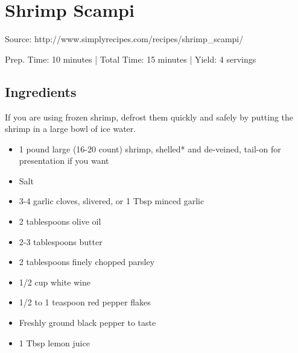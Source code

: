 \section{Shrimp Scampi}

Source: http://www.simplyrecipes.com/recipes/shrimp\_scampi/

\begin{center}
Prep. Time: 10 minutes |
Total Time: 15 minutes |
Yield: 4 servings
\end{center}

\subsection{Ingredients}
If you are using frozen shrimp, defrost them quickly and safely by putting the shrimp in a large bowl of ice water.
\begin{multicols}{2}
\begin{itemize}
    \item 1 pound large (16-20 count) shrimp, shelled* and de-veined, tail-on for presentation if you want
    \item Salt
    \item 3-4 garlic cloves, slivered, or 1 Tbsp minced garlic
    \item 2 tablespoons olive oil
    \item 2-3 tablespoons butter
    \item 2 tablespoons finely chopped parsley
    \item 1/2 cup white wine
    \item 1/2 to 1 teaspoon red pepper flakes
    \item Freshly ground black pepper to taste
    \item 1 Tbsp lemon juice
\end{itemize}
\end{multicols}

